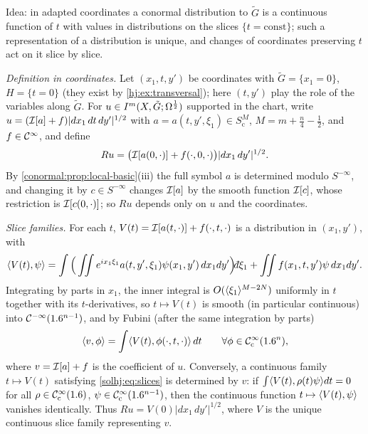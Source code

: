 \subsection*{}
Idea: in adapted coordinates a conormal distribution to $\tilde G$ is a continuous function of
$t$ with values in distributions on the slices $\{t=\text{const}\}$; such a representation of
a distribution is unique, and changes of coordinates preserving $t$ act on it slice by slice.

\emph{Definition in coordinates.} Let $(x_1,t,y')$ be coordinates with $\tilde G=\{x_1=0\}$,
$H=\{t=0\}$ (they exist by \cref{hj:ex:transversal}); here $(t,y')$ play the role of the
variables along $\tilde G$. For $u\in I^{m}(X,\tilde G;\Omega^{\frac12})$ supported in the chart, write
$u=(\mathcal{I}[a]+f)|dx_1\,dt\,dy'|^{1/2}$ with $a=a(t,y',\xi_1)\in S^M_{\mathrm c}$, $M=m+\frac n4-
\frac12$, and $f\in\mathcal{C}^\infty$, and define
\begin{equation*}
R u=\big(\mathcal{I}[a(0,\cdot)]+f(\cdot,0,\cdot)\big)|dx_1\,dy'|^{1/2}.
\end{equation*}
By \cref{conormal:prop:local-basic}(iii) the full symbol $a$ is determined modulo
$S^{-\infty}$, and changing it by $c\in S^{-\infty}$ changes $\mathcal{I}[a]$ by the smooth function
$\mathcal{I}[c]$, whose restriction is $\mathcal{I}[c(0,\cdot)]$; so $Ru$ depends only on $u$ and the
coordinates.

\emph{Slice families.} For each $t$, $V(t)=\mathcal{I}[a(t,\cdot)]+f(\cdot,t,\cdot)$ is a distribution
in $(x_1,y')$, with
\begin{equation*}
\pair{V(t)}\psi=\int\Big(\iint e^{ix_1\xi_1}a(t,y',\xi_1)\psi(x_1,y')\,dx_1dy'\Big)
\dbar\xi_1+\iint f(x_1,t,y')\psi\,dx_1dy' .
\end{equation*}
Integrating by parts in $x_1$, the inner integral is $O(\langle \xi_1\rangle^{M-2N})$ uniformly in $t$
together with its $t$-derivatives, so $t\mapsto V(t)$ is smooth (in particular continuous)
into $\mathcal{C}^{-\infty}(1.6^{n-1})$, and by Fubini (after the same integration by parts)
\begin{equation}\label{solhj:eq:slices}
\langle v, \phi\rangle=\int\langle V(t), \phi(\cdot,t,\cdot)\rangle\,dt\qquad\forall\phi\in\mathcal{C}^\infty_{\mathrm{c}}(1.6^n),
\end{equation}
where $v=\mathcal{I}[a]+f$ is the coefficient of $u$. Conversely, a continuous family $t\mapsto V(t)$
satisfying \eqref{solhj:eq:slices} is determined by $v$: if $\int\langle V(t), \rho(t)\psi\rangle dt
=0$ for all $\rho\in\mathcal{C}^\infty_{\mathrm{c}}(1.6)$, $\psi\in\mathcal{C}^\infty_{\mathrm{c}}(1.6^{n-1})$, then the continuous function
$t\mapsto\langle V(t), \psi\rangle$ vanishes identically. Thus $Ru=V(0)|dx_1\,dy'|^{1/2}$, where $V$ is
the unique continuous slice family representing $v$.

